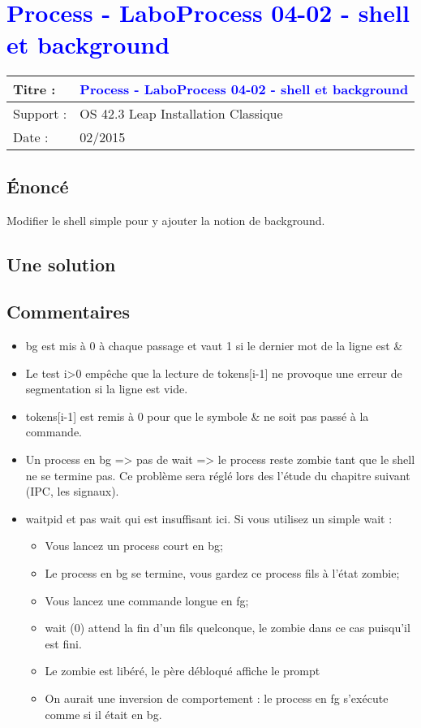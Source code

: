 \lstset{language=c}
\renewcommand{\titre}{\textcolor{blue}{ Process - LaboProcess 04-02 - shell et background }}

\lhead{ \titre }
\section{{\titre} }

\begin{tabular}{|l|l|}
\hline
Titre : 	& \titre \\\hline
Support : 	& OS 42.3 Leap Installation Classique \\\hline
Date :		& 02/2015 \\\hline
\end{tabular}

\subsection{Énoncé}

Modifier le shell simple pour y ajouter la notion de background.

\subsection{Une solution}



\subsection{Commentaires}

\begin{itemize}
\item bg est mis à 0 à chaque passage et vaut 1 si le dernier mot de la ligne est \&  
\item Le test i>0 empêche que la lecture de tokens[i-1] ne provoque une erreur de segmentation si la ligne est vide.
\item tokens[i-1] est remis à 0 pour que le symbole \& ne soit pas passé à la commande.
\item Un process en bg => pas de wait => le process reste zombie tant que le shell ne se termine pas. Ce problème sera réglé lors des l'étude du chapitre suivant (IPC, les signaux).
\item waitpid et pas wait qui est insuffisant ici. Si vous utilisez un simple wait :
	\begin{itemize}
	\item Vous lancez un process court en bg;
	\item Le process en bg se termine, vous gardez ce process fils à l'état zombie;
	\item Vous lancez une commande longue en fg;
	\item wait (0) attend la fin d'un fils quelconque, le zombie dans ce cas puisqu'il est fini. 
	\item Le zombie est libéré, le père débloqué affiche le prompt
	\item On aurait une inversion de comportement : le process en fg s'exécute comme si il était en bg.
	\end{itemize}
\end{itemize}
\newpage
